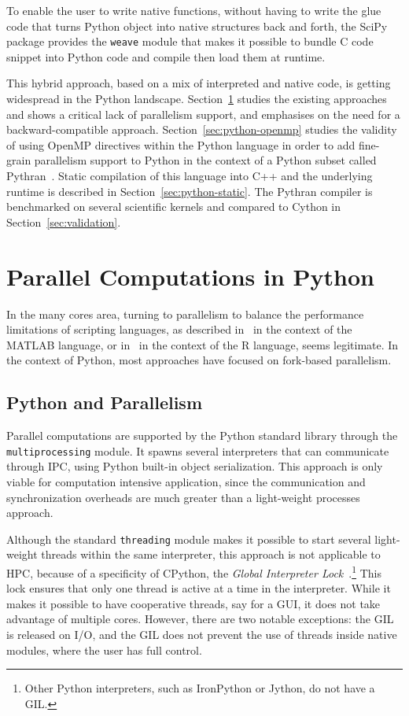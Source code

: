 \documentclass{sigplanconf}
\begin{document}
To enable the user to write native functions, without having to write the glue
code that turns Python object into native structures back and forth, the SciPy
package provides the \texttt{weave} module that makes it possible to bundle C
code snippet into Python code and compile then load them at runtime.

This hybrid approach, based on a mix of interpreted and native code, is getting
widespread in the Python landscape. Section~\ref{sec:python-parallel} studies
the existing approaches and shows a critical lack of parallelism support, and
emphasises on the need for a backward-compatible approach.
Section~\ref{sec:python-openmp} studies the validity of using OpenMP directives
within the Python language in order to add fine-grain parallelism support to
Python in the context of a Python subset called Pythran~\cite{pythran2013}.
Static compilation of this language into C++ and the underlying runtime is
described in Section~\ref{sec:python-static}. The Pythran compiler is
benchmarked on several scientific kernels and compared to Cython in
Section~\ref{sec:validation}.

\section{Parallel Computations in Python}\label{sec:python-parallel}

In the many cores area, turning to parallelism to balance the performance
limitations of scripting languages, as described in~\cite{choy05} in the context
of the MATLAB language, or in~\cite{mals07} in the context of the R language,
seems legitimate. In the context of Python, most approaches have focused on
fork-based parallelism.

\subsection{Python and Parallelism}

Parallel computations are supported by the Python standard library through the
\texttt{multiprocessing} module. It spawns several interpreters that can
communicate through IPC, using Python built-in object serialization. This
approach is only viable for computation intensive application, since the
communication and synchronization overheads are much greater than a light-weight
processes approach.

Although the standard \texttt{threading} module makes it possible to start
several light-weight threads within the same interpreter, this approach is not
applicable to HPC, because of a specificity of CPython, the \emph{Global
Interpreter Lock}~\cite{gil2012}.\footnote{Other Python interpreters, such as
IronPython or Jython, do not have a GIL.} This lock ensures that only one thread
is active at a time in the interpreter. While it makes it possible to have
cooperative threads, say for a GUI, it does not take advantage of multiple
cores.  However, there are two notable exceptions: the GIL is released on I/O,
and the GIL does not prevent the use of threads inside native modules, where the
user has full control.
\end{document}
